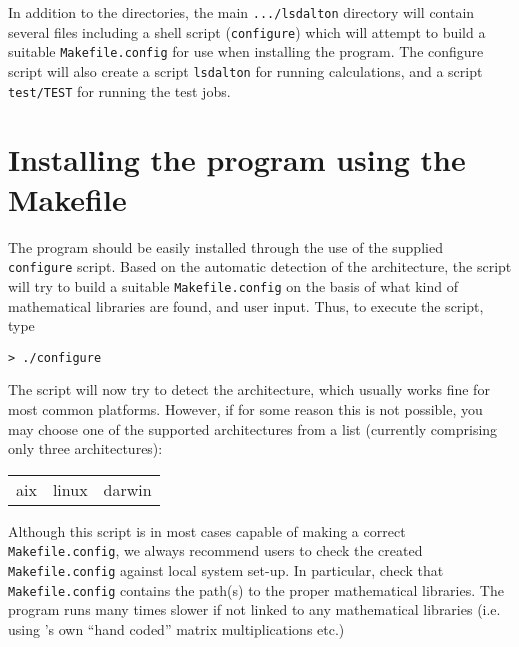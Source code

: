 In addition to the directories, the main \verb|.../lsdalton| directory will
contain several files including a shell script (\verb|configure|)
which will attempt to build a suitable \verb|Makefile.config| for use when
installing the program. The configure script will also create a
script \verb|lsdalton| for running calculations, and a script
\verb|test/TEST| for running the test jobs.

\section{Installing the program using the
Makefile}\label{sec:Makefile}

The program should be easily installed through the use of the supplied
\verb|configure| script. Based on the
automatic detection of the architecture, the
script will try to build a suitable
\verb|Makefile.config| on the
basis of what kind of mathematical libraries are found, and user
input. Thus, to execute the script, type
\begin{verbatim}
> ./configure 
\end{verbatim}

The script will now try to detect the architecture, which usually works fine
for most common platforms. However, if for some reason this is not possible, you
may choose one of the supported architectures from a list (currently comprising
only three architectures):

\bigskip

\begin{tabular}{lll}
aix \hspace{2cm} & linux \hspace{2cm}    & darwin\\
\end{tabular}

\bigskip

Although this script is in most cases  capable of making a correct
\verb|Makefile.config|, we always recommend users to check the created
\verb|Makefile.config| against local system set-up. 
In particular, check that \verb|Makefile.config| contains the path(s)
to the proper mathematical libraries. The program runs many times slower
if not linked to any mathematical libraries (i.e. using {\lsdalton}'s own 
``hand coded'' matrix multiplications etc.)

